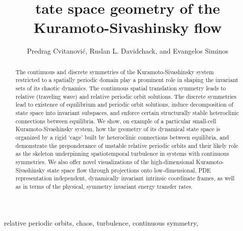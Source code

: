 \documentclass{siamltex}          %
\begin{document}
                \title{
tate space geometry of the
Kuramoto-Sivashinsky flow 
                 }
                  \author{
Predrag Cvitanovi\'c\footnotemark[1],
Ruslan L. Davidchack\footnotemark[2],
    and
Evangelos Siminos\footnotemark[1]
                    }

                \maketitle

\renewcommand{\thefootnote}{\fnsymbol{footnote}}
\renewcommand{\thefootnote}{\arabic{footnote}}

                \begin{abstract}
The continuous and discrete symmetries of the
Kuramoto-Sivashinsky system restricted to a spatially
periodic domain play a prominent role in shaping the
invariant sets of its chaotic dynamics. The continuous
spatial translation symmetry leads to relative
 (traveling wave) and relative periodic
orbit  solutions. The
discrete symmetries lead to existence of {equilibrium} and
periodic orbit solutions, induce decomposition of state space
into invariant subspaces, and enforce certain structurally
stable heteroclinic connections between equilibria. We show,
on  example of a particular small-cell Kuramoto-Sivashinsky
system, how the geometry of its dynamical state space is
organized by a rigid `cage' built by heteroclinic connections
between equilibria, and demonstrate the preponderance of
unstable relative periodic orbits and their likely role as
the skeleton underpinning spatiotemporal turbulence in
systems with continuous symmetries. We also offer novel
visualizations of the high-dimensional Kuramoto-Sivashinsky
state space flow through projections onto low-dimensional,
PDE representation independent, dynamically invariant
intrinsic coordinate frames, as well as in terms of the
physical, symmetry invariant energy transfer rates.
                \end{abstract}

\begin{keywords}
relative periodic orbits, chaos, turbulence, continuous symmetry, {\KSe}
\end{keywords}
\end{document}
